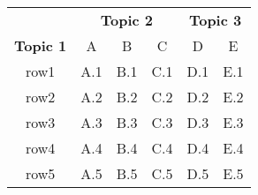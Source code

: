 \begin{landscape}
\begin{table}[h]
\centering
\begin{tabular}{cccccc}
\toprule
\multicolumn{1}{c}{} & \multicolumn{3}{c}{\textbf{Topic 2}} & \multicolumn{2}{c}{\textbf{Topic 3}} \\
\cmidrule(rl){2-4} \cmidrule(rl){5-6}
\textbf{Topic 1} & {A} & {B} & {C} & {D} & {E} \\
\midrule
\rowcolor{lavender}
row1 & A.1 & B.1 & C.1 & D.1 & E.1 \\
row2 & A.2 & B.2 & C.2 & D.2 & E.2 \\
\rowcolor{lavender}
row3 & A.3 & B.3 & C.3 & D.3 & E.3 \\
row4 & A.4 & B.4 & C.4 & D.4 & E.4 \\
\rowcolor{lavender}
row5 & A.5 & B.5 & C.5 & D.5 & E.5 \\
\bottomrule
\end{tabular}
\end{table}
\end{landscape}